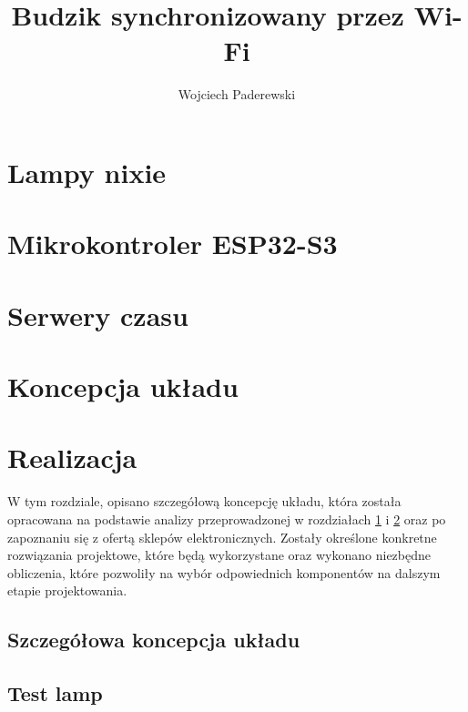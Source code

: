 \documentclass[twoside]{article}
\title{Budzik synchronizowany przez Wi-Fi}
\author{Wojciech Paderewski}
\numberwithin{equation}{section}
\begin{document}

\thispagestyle{empty}
\cleardoublepage


\cleardoublepage

\tableofcontents
\newpage

\cleardoublepage


\newpage

\section{Lampy nixie}

\label{sec:nixie}
\newpage


\section{Mikrokontroler ESP32-S3}
\label{sec:esp32}

\newpage


\section{Serwery czasu}
\label{sec:serwery_czasu}

\newpage


\section{Koncepcja układu}

\newpage

\section{Realizacja}
\label{sec:realizacja}
W tym rozdziale, opisano szczegółową koncepcję układu, która została opracowana na podstawie analizy przeprowadzonej w rozdziałach \ref{sec:nixie} i \ref{sec:esp32} 
oraz po zapoznaniu się z ofertą sklepów elektronicznych.
Zostały określone konkretne rozwiązania projektowe, które będą wykorzystane oraz wykonano niezbędne obliczenia,
które pozwoliły na wybór odpowiednich komponentów na dalszym etapie projektowania.

\subsection{Szczegółowa koncepcja układu}

\newpage

\subsection{Test lamp}

\newpage
\end{document}
